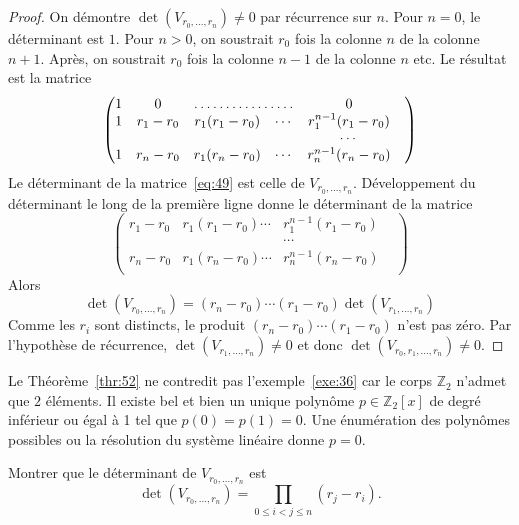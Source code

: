 \begin{proof}
   On démontre  $\det(V_{r_0,\dots,r_n}) ≠0$ par récurrence sur $n$. Pour $n = 0$, le déterminant est $1$. Pour $n>0$, on soustrait $r_0$ fois la colonne $n$ de la colonne $n+1$. Après, on soustrait $r_0$ fois la colonne $n-1$ de la colonne $n$ etc. Le résultat est la matrice
   \begin{equation}
     \label{eq:49}
     \begin{pmatrix}
       1 & 0  &      \hdotsfor{2} &  0 \\
       1 & r_1- r_0&  r_1 (r_1-r_0)  & \cdots & r_1^{n-1} (r_1 - r_0) \\
       & & &  & \cdots  &  \\
       1 & r_n -r_0&  r_1 (r_n-r_0) & \cdots & r_n^{n-1} (r_n - r_0) \\
     \end{pmatrix}
   \end{equation}
   Le déterminant de la matrice~\eqref{eq:49} est celle de
   $V_{r_0,\dots,r_n}$. Développement du déterminant le long de la
   première ligne donne le déterminant de la matrice
 \begin{equation}
\label{eq:50}
    \begin{pmatrix}
       r_1- r_0&  r_1 (r_1-r_0) \cdots & r_1^{n-1} (r_1 - r_0) \\
        & &  \cdots  &  \\
        r_n -r_0&  r_1 (r_n-r_0) \cdots & r_n^{n-1} (r_n - r_0) \\
     \end{pmatrix}
   \end{equation}
   Alors
   \begin{displaymath}
     \det(V_{r_0,\dots,r_n})  = (r_n-r_0) \cdots (r_1-r_0)  \det(V_{r_1,\dots,r_n})
   \end{displaymath}      
Comme les $r_i$ sont distincts, le produit   $(r_n-r_0) \cdots (r_1-r_0) $ n'est pas zéro. Par l'hypothèse de récurrence, $\det(V_{r_1,\dots,r_n}) ≠0$ et donc $\det(V_{r_0,r_1,\dots,r_n}) ≠0$.  
\end{proof}

Le Théorème~\ref{thr:52} ne contredit pas l'exemple~\ref{exe:36} car le corps $ℤ_2$ n'admet que $2$ éléments. Il existe bel et bien un unique polynôme $p \in  ℤ_2[x]$ de degré inférieur ou égal à 1 tel que $p(0) = p(1) = 0$. Une énumération des polynômes possibles ou la résolution du système linéaire donne $p=0$.

\begin{exercise}
  \label{exe:37}
  Montrer que le déterminant de $V_{r_0,\dots,r_n}$ est
  \begin{displaymath}
    \det (V_{r_0,\dots,r_n}) = ∏_{0 ≤ i<j ≤n} (r_j - r_i). 
  \end{displaymath}
\end{exercise}



